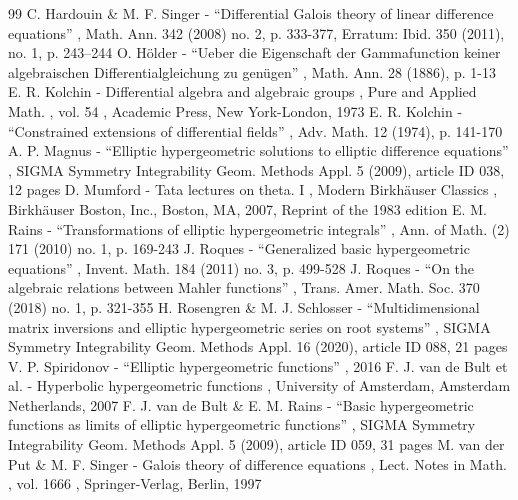 \documentclass[11pt]{article}
\numberwithin{equation}{section}\providecommand{\loccit}{\textit{loc.\ cit.}}
\begin{document}
\begin{thebibliography}{99}
 C. Hardouin \& M. F. Singer - “Differential Galois theory of linear difference equations” , Math. Ann. 342 (2008) no. 2, p. 333-377, Erratum: Ibid. 350 (2011), no. 1, p. 243–244
 O. Hölder - “Ueber die Eigenschaft der Gammafunction keiner algebraischen Differentialgleichung zu genügen” , Math. Ann. 28 (1886), p. 1-13
 E. R. Kolchin - Differential algebra and algebraic groups , Pure and Applied Math. , vol. 54 , Academic Press, New York-London, 1973
 E. R. Kolchin - “Constrained extensions of differential fields” , Adv. Math. 12 (1974), p. 141-170
 A. P. Magnus - “Elliptic hypergeometric solutions to elliptic difference equations” , SIGMA Symmetry Integrability Geom. Methods Appl. 5 (2009), article ID 038, 12 pages
 D. Mumford - Tata lectures on theta. I , Modern Birkhäuser Classics , Birkhäuser Boston, Inc., Boston, MA, 2007, Reprint of the 1983 edition
 E. M. Rains - “Transformations of elliptic hypergeometric integrals” , Ann. of Math. (2) 171 (2010) no. 1, p. 169-243
 J. Roques - “Generalized basic hypergeometric equations” , Invent. Math. 184 (2011) no. 3, p. 499-528
 J. Roques - “On the algebraic relations between Mahler functions” , Trans. Amer. Math. Soc. 370 (2018) no. 1, p. 321-355
 H. Rosengren \& M. J. Schlosser - “Multidimensional matrix inversions and elliptic hypergeometric series on root systems” , SIGMA Symmetry Integrability Geom. Methods Appl. 16 (2020), article ID 088, 21 pages
 V. P. Spiridonov - “Elliptic hypergeometric functions” , 2016
 F. J. van de Bult et al. - Hyperbolic hypergeometric functions , University of Amsterdam, Amsterdam Netherlands, 2007
 F. J. van de Bult \& E. M. Rains - “Basic hypergeometric functions as limits of elliptic hypergeometric functions” , SIGMA Symmetry Integrability Geom. Methods Appl. 5 (2009), article ID 059, 31 pages
 M. van der Put \& M. F. Singer - Galois theory of difference equations , Lect. Notes in Math. , vol. 1666 , Springer-Verlag, Berlin, 1997
\end{thebibliography}
\end{document}
